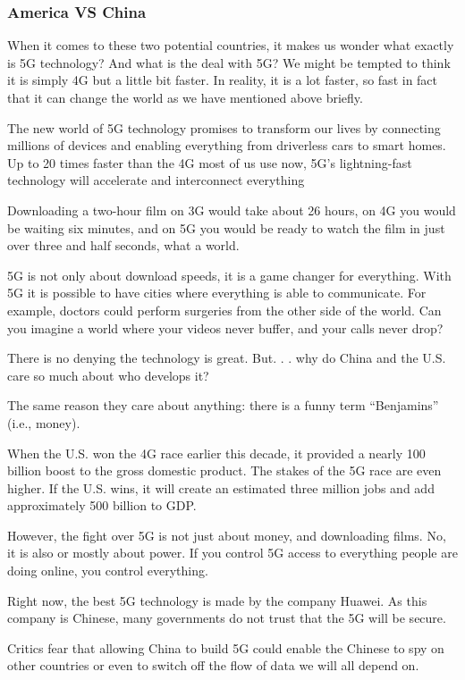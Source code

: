 \subsubsection{America VS China}
When it comes to these two potential countries, it makes us wonder what exactly is 5G technology? And what is the deal with 5G? We might be tempted to think it is simply 4G but a little bit faster. In reality, it is a lot faster, so fast in fact that it can change the world as we have mentioned above briefly.
\item The new world of 5G technology promises to transform our lives by connecting millions of devices and enabling everything from driverless cars to smart homes. Up to 20 times faster than the 4G most of us use now, 5G’s lightning-fast technology will accelerate and interconnect everything
\item Downloading a two-hour film on 3G would take about 26 hours, on 4G you would be waiting six minutes, and on 5G you would be ready to watch the film in just over three and half seconds, what a world.
\item 5G is not only about download speeds, it is a game changer for everything. With 5G it is possible to have cities where everything is able to communicate. For example, doctors could perform surgeries from the other side of the world. Can you imagine a world where your videos never buffer, and your calls never drop?
\item There is no denying the technology is great. But. . . why do China and the U.S. care so much about who develops it?
\item The same reason they care about anything: there is a funny term “Benjamins” (i.e., money).
\item When the U.S. won the 4G race earlier this decade, it provided a nearly 100 billion boost to the gross domestic product. The stakes of the 5G race are even higher. If the U.S. wins, it will create an estimated three million jobs and add approximately 500 billion to GDP.
\item However, the fight over 5G is not just about money, and downloading films. No, it is also or mostly about power. If you control 5G access to everything people are doing online, you control everything.
\item Right now, the best 5G technology is made by the company Huawei. As this company is Chinese, many governments do not trust that the 5G will be secure.
\item Critics fear that allowing China to build 5G could enable the Chinese to spy on other countries or even to switch off the flow of data we will all depend on.
